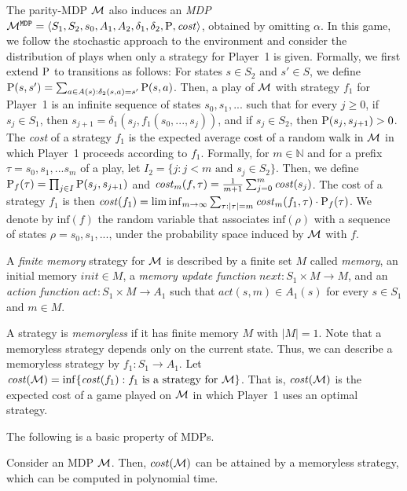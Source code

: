 \documentclass[runningheads,a4paper]{llncs}
\newcommand{\set}[1]{{\{#1\}}}
\newcommand{\Nat}{\mathbb{N}}
\newcommand{\zug}[1]{\langle #1  \rangle}
\newcommand{\M}{{\cal M}}
\newcommand{\MDP}{{\mathtt{MDP}}}
\newcommand{\Inf}{\mbox{inf}}
\newcommand{\cost}{{\it cost}}
\newcommand{\Act}{A}
\newcommand{\MDPProb}{{\rm P}}
\newcommand{\MDPcost}{{\it cost}}
\begin{document}
The parity-MDP  $\M$ also induces an {\em MDP\/} $\M^{\MDP}=\zug{S_1, S_2,s_0,\Act_1,\Act_2,\delta_1, \delta_2,\MDPProb,\MDPcost}$, obtained by omitting $\alpha$. In this game, we follow the stochastic approach to the environment and consider the distribution of plays when only a strategy for Player~1 is given. Formally, we first extend $\MDPProb$ to transitions as follows: For states $s\in S_2$ and $s'\in S$, we define $\MDPProb(s,s')=\sum_{a\in A(s): \delta_2(s,a)=s'}\MDPProb(s,a)$.
Then, a play of $\M$ with strategy $f_1$ for Player~1 is an infinite sequence of states $s_0,s_1,...$ such that for every $j\ge 0$, if $s_j\in S_1$, then $s_{j+1}=\delta_1(s_{j},f_1(s_0,...,s_{j}))$, and if $s_j\in S_2$, then $\MDPProb(s_j,s_{j+1})>0$. 
The {\em cost} of a strategy $f_1$ is the expected average cost of a random walk in $\M$ in which Player~1 proceeds according to $f_1$. Formally, for $m\in \Nat$ and for a prefix $\tau =s_0,s_1,...s_m$ of a play, let $I_2=\set{j:j<m\text{ and } s_j\in S_2}$. Then, we define $\MDPProb_f(\tau)=\prod_{j\in I} \MDPProb(s_{j},s_{j+1})$ and $\cost_m(f,\tau)=\frac{1}{m+1}\sum_{j=0}^m \MDPcost(s_j)$. 
The cost of a strategy $f_1$ is then  $\cost(f_1)=\liminf_{m\to\infty}\sum_{\tau:|\tau|=m} \cost_m(f_1,\tau)\cdot \MDPProb_f(\tau)$.
We denote by $\Inf(f)$ the random variable that associates $\Inf(\rho)$ with a sequence of states $\rho=s_0,s_1,...$, under the probability space induced by $\M$ with $f$.

A {\em finite memory} strategy for $\M$ is described by a finite set $M$ called {\em memory}, an initial memory $init\in M$, a {\em memory update function} $next:S_1\times M\to M$, and an {\em action function} $act:S_1\times M\to \Act_1$ such that $act(s,m)\in \Act_1(s)$ for every $s\in S_1$ and $m\in M$. 

A strategy is {\em memoryless} if it has finite memory $M$ with $|M|=1$. Note that a memoryless strategy depends only on the current state. Thus, we can describe a memoryless strategy by  $f_1:S_1\to \Act_1$. 
Let $\cost(\M)=\inf \{\cost(f_1): f_1 \mbox{ is a strategy for }\M\}$. That is, $\cost(\M)$ is the expected cost of a game played on $\M$ in which Player~1 uses an optimal strategy.  

The following is a basic property of MDPs.
\vspace*{-5pt}
\begin{theorem}
	\label{thm:solving MDP in P}
Consider an MDP $\M$. Then, $cost(\M)$ can be attained by a memoryless strategy, which can be computed in polynomial time.
\end{theorem}
\vspace*{-5pt}
\end{document}
